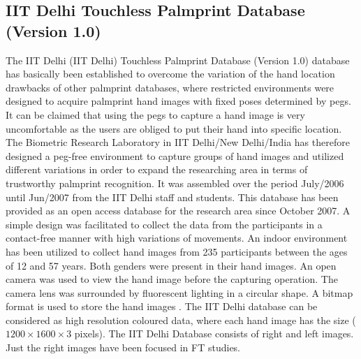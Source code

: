 \documentclass[review]{elsarticle}
\begin{document}
\subsection{IIT Delhi Touchless Palmprint Database (Version 1.0)} 
	The IIT Delhi (IIT Delhi) Touchless Palmprint Database (Version 1.0) database has basically been established to overcome the variation of the hand location drawbacks of other palmprint databases, where restricted environments were designed to acquire palmprint hand images with fixed poses determined by pegs. It can be claimed that using the pegs to capture a hand image is very uncomfortable as the users are obliged to put their hand into specific location. The Biometric Research Laboratory in IIT Delhi/New Delhi/India has therefore designed a peg-free environment to capture groups of hand images and utilized different variations in order to expand the researching area in terms of trustworthy palmprint recognition. It was assembled over the period July/2006 until Jun/2007 from the IIT Delhi staff and students. This database has been provided as an open access database for the research area since October 2007. A simple design was facilitated to collect the data from the participants in a contact-free manner with high variations of movements. An indoor environment has been utilized to collect hand images from 235 participants between the ages of 12 and 57 years. Both genders were present in their hand images. An open camera was used to view the hand image before the capturing operation. The camera lens was surrounded by fluorescent lighting in a circular shape. A bitmap format is used to store the hand images \cite{IIT-Delhi-PalmprintV1}. The IIT Delhi database can be considered as high resolution coloured data, where each hand image has the size ($1200\times 1600\times 3$ pixels). The IIT Delhi Database consists of right and left images. Just the right images have been focused in FT studies.  
\end{document}
